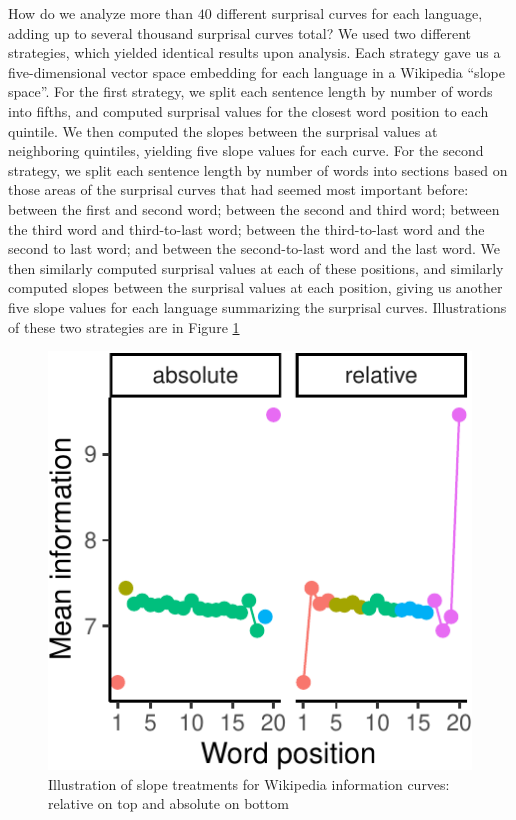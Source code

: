 \documentclass[man,floatsintext]{apa6}
\begin{document}
How do we analyze more than \(40\) different surprisal curves for each language, adding up to several thousand surprisal curves total? We used two different strategies, which yielded identical results upon analysis. Each strategy gave us a five-dimensional vector space embedding for each language in a Wikipedia \enquote{slope space}. For the first strategy, we split each sentence length by number of words into fifths, and computed surprisal values for the closest word position to each quintile. We then computed the slopes between the surprisal values at neighboring quintiles, yielding five slope values for each curve. For the second strategy, we split each sentence length by number of words into sections based on those areas of the surprisal curves that had seemed most important before: between the first and second word; between the second and third word; between the third word and third-to-last word; between the third-to-last word and the second to last word; and between the second-to-last word and the last word. We then similarly computed surprisal values at each of these positions, and similarly computed slopes between the surprisal values at each position, giving us another five slope values for each language summarizing the surprisal curves. Illustrations of these two strategies are in Figure \ref{fig:treatments}

\begin{figure}
\centering
\includegraphics{figs/treatments-1.pdf}
\caption{\label{fig:treatments}Illustration of slope treatments for Wikipedia information curves: relative on top and absolute on bottom}
\end{figure}
\end{document}
